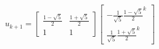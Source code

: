 \documentclass[preview]{standalone}
\begin{document}
\begin{center}
$$u_{k + 1} = \begin{bmatrix} \frac{1 - \sqrt{5}}{2} & \frac{1 + \sqrt{5}}{2} \\ 1 & 1 \end{bmatrix} \begin{bmatrix} - \frac{1}{\sqrt{5}} \frac{1 - \sqrt{5}}{2}^k \\ \frac{1}{\sqrt{5}} \frac{1 + \sqrt{5}}{2}^k \end{bmatrix}$$
\end{center}
\end{document}
